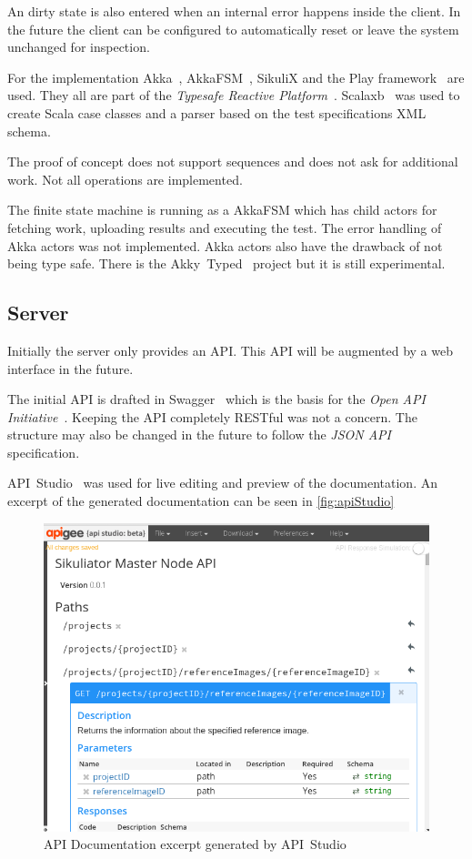 \documentclass[a4paper,twocolumn,twoside]{article}
\begin{document}
An dirty state is also entered when an internal error happens inside the client.
In the future the client can be configured to automatically reset or leave the system unchanged for inspection.

For the implementation Akka~\cite{Akka}, AkkaFSM~\cite{AkkaFSM}, SikuliX and the Play framework~\cite{Play} are used.
They all are part of the \emph{Typesafe Reactive Platform}~\cite{TypesafeRP}.
Scalaxb~\cite{scalaxb} was used to create Scala case classes and a parser based on the test specifications XML schema.

The proof of concept does not support sequences and does not ask for additional work.
Not all operations are implemented.

The finite state machine is running as a AkkaFSM which has child actors for fetching work, uploading results and executing the test.
The error handling of Akka actors was not implemented.
Akka actors also have the drawback of not being type safe.
There is the Akky~Typed~\cite{AkkaTyped} project but it is still experimental.

\subsection{Server}

Initially the server only provides an API.
This API will be augmented by a web interface in the future.

The initial API is drafted in Swagger~\cite{Swagger} which is the basis for the \emph{Open API Initiative}~\cite{OpenAPI}.
Keeping the API completely RESTful was not a concern.
The structure may also be changed in the future to follow the \emph{JSON API}~\cite{JSONAPI} specification.

API~Studio~\cite{ApiStudio} was used for live editing and preview of the documentation.
An excerpt of the generated documentation can be seen in \autoref{fig:apiStudio}

\begin{figure}[htbp]
	\centering
	\includegraphics[width=0.8\linewidth]{../img/apiStudio}
	\caption{API Documentation excerpt generated by API~Studio}
	\label{fig:apiStudio}
\end{figure}
\end{document}
